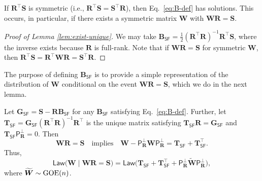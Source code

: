 \documentclass[]{article}
\def\bR{{\boldsymbol R}}
\def\bW{{\boldsymbol W}}
\def\bT{\boldsymbol{T}}
\def\bS{\boldsymbol{S}}
\def\proj{{\mathsf P}}
\def\bB{{\boldsymbol B}}
\def\bW{{\boldsymbol W}}
\def\bG{{\boldsymbol G}}
\def\proj{{\mathsf P}}
\def\GOE{{\rm GOE}}
\def\bWtilde{\widetilde{\boldsymbol{W}}{}}
\def\SF{\mathsf{SF}}
\def\bWtilde{\widetilde{\boldsymbol{W}}{}}
\def\Law{\mathsf{Law}}
\begin{document}
\begin{lemma}
\label{lem:exist-unique}
    If $\bR^\top \bS$ is symmetric (i.e., $\bR^\top \bS = \bS^\top \bR$), 
    then Eq.~\eqref{eq:B-def} has solutions.
    This occurs, in particular, 
    if there exists a symmetric matrix $\bW$ with $\bW \bR = \bS$.
\end{lemma}

\begin{proof}[Proof of Lemma \ref{lem:exist-unique}]
    We may take $\bB_{\SF} = \frac12(\bR^\top \bR)^{-1}\bR^\top \bS$,
    where the inverse exists because $\bR$ is full-rank.
    Note that if $\bW \bR = \bS$ for symmetric $\bW$, then $\bR^\top \bS = \bR^\top \bW \bR = \bS^\top \bR$.
\end{proof}

The purpose of defining $\bB_{\SF}$ is to provide a simple representation of the distribution of $\bW$ conditional on the event $\bW \bR = \bS$,
which we do in the next lemma.
\begin{lemma}
\label{lem:W-det}
    Let $\bG_{\SF} = \bS - \bR \bB_{\SF}$ for any $\bB_{\SF}$ satisfying Eq.~\eqref{eq:B-def}.
    Further, let $\bT_{\SF} = \bG_{\SF}(\bR^\top \bR)^{-1}\bR^\top$ is the unique matrix satisfying $\bT_{\SF} \bR = \bG_{\SF}$ and $\bT_{\SF} \proj_{\bR}^\perp = 0$.
    Then
    \begin{equation}
        \bW \bR = \bS
        \quad 
        \text{implies}
        \quad
        \bW - \proj_{\bR}^\perp \bW \proj_{\bR}^\perp
            = 
            \bT_{\SF} + \bT_{\SF}^\top.
    \end{equation}
    Thus,
    \begin{equation}
        \Law\big(\bW \mid \bW\bR = \bS\big)
        =
        \Law\big(\bT_{\SF} + \bT_{\SF}^\top + \proj_{\bR}^\perp \bWtilde \proj_{\bR}^\perp \big),
    \end{equation}
    where $\bWtilde \sim \GOE(n)$.
\end{lemma}
\end{document}
